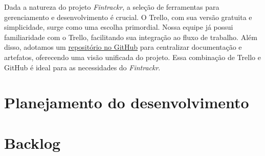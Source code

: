 Dada a natureza do projeto \textit{Fintrackr}, a seleção de ferramentas para gerenciamento e desenvolvimento é crucial. O Trello, com sua versão gratuita e simplicidade, surge como uma escolha primordial. Nossa equipe já possui familiaridade com o Trello, facilitando sua integração ao fluxo de trabalho. Além disso, adotamos um \href{https://github.com/ThiagoSchumann/fintrackr-docs}{repositório no GitHub} para centralizar documentação e artefatos, oferecendo uma visão unificada do projeto. Essa combinação de Trello e GitHub é ideal para as necessidades do \textit{Fintrackr}.


\section{Planejamento do desenvolvimento}

\section{Backlog}
